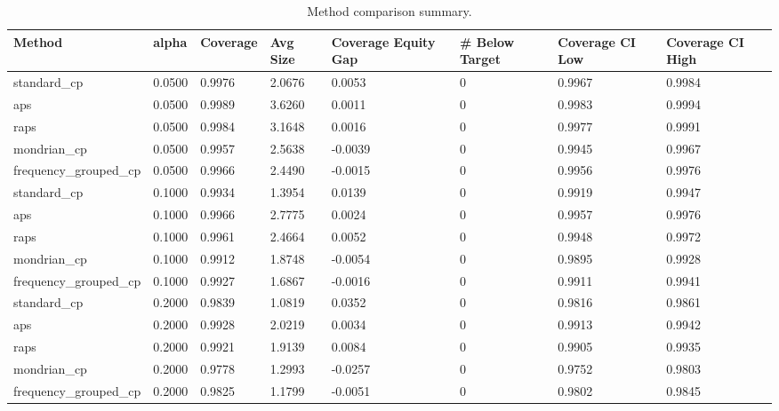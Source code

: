 \begin{table}[htbp]
\centering
\caption{Method comparison summary.}
\label{tab:method\_comparison}
\begin{tabular}{llllllll}
\hline
Method & alpha & Coverage & Avg Size & Coverage Equity Gap & \# Below Target & Coverage CI Low & Coverage CI High \\
\hline
standard\_cp & 0.0500 & 0.9976 & 2.0676 & 0.0053 & 0 & 0.9967 & 0.9984 \\
aps & 0.0500 & 0.9989 & 3.6260 & 0.0011 & 0 & 0.9983 & 0.9994 \\
raps & 0.0500 & 0.9984 & 3.1648 & 0.0016 & 0 & 0.9977 & 0.9991 \\
mondrian\_cp & 0.0500 & 0.9957 & 2.5638 & -0.0039 & 0 & 0.9945 & 0.9967 \\
frequency\_grouped\_cp & 0.0500 & 0.9966 & 2.4490 & -0.0015 & 0 & 0.9956 & 0.9976 \\
standard\_cp & 0.1000 & 0.9934 & 1.3954 & 0.0139 & 0 & 0.9919 & 0.9947 \\
aps & 0.1000 & 0.9966 & 2.7775 & 0.0024 & 0 & 0.9957 & 0.9976 \\
raps & 0.1000 & 0.9961 & 2.4664 & 0.0052 & 0 & 0.9948 & 0.9972 \\
mondrian\_cp & 0.1000 & 0.9912 & 1.8748 & -0.0054 & 0 & 0.9895 & 0.9928 \\
frequency\_grouped\_cp & 0.1000 & 0.9927 & 1.6867 & -0.0016 & 0 & 0.9911 & 0.9941 \\
standard\_cp & 0.2000 & 0.9839 & 1.0819 & 0.0352 & 0 & 0.9816 & 0.9861 \\
aps & 0.2000 & 0.9928 & 2.0219 & 0.0034 & 0 & 0.9913 & 0.9942 \\
raps & 0.2000 & 0.9921 & 1.9139 & 0.0084 & 0 & 0.9905 & 0.9935 \\
mondrian\_cp & 0.2000 & 0.9778 & 1.2993 & -0.0257 & 0 & 0.9752 & 0.9803 \\
frequency\_grouped\_cp & 0.2000 & 0.9825 & 1.1799 & -0.0051 & 0 & 0.9802 & 0.9845 \\
\hline
\end{tabular}
\end{table}
